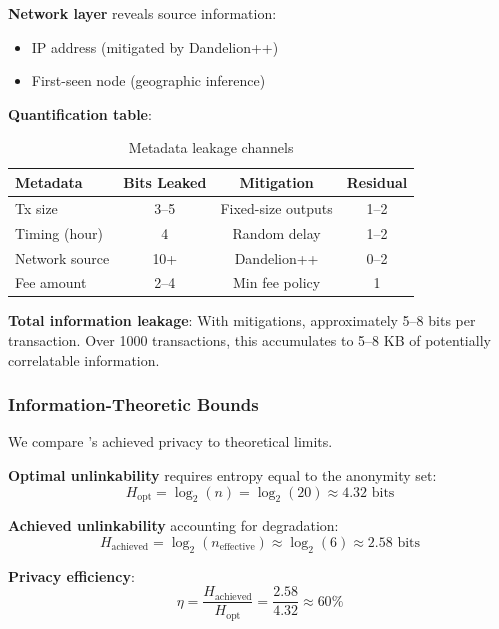 \textbf{Network layer} reveals source information:
\begin{itemize}
  \item IP address (mitigated by Dandelion++)
  \item First-seen node (geographic inference)
\end{itemize}

\textbf{Quantification table}:

\begin{table}[h]
\centering
\caption{Metadata leakage channels}
\label{tab:metadata-leak}
\begin{tabular}{@{}lccc@{}}
\toprule
\textbf{Metadata} & \textbf{Bits Leaked} & \textbf{Mitigation} & \textbf{Residual} \\
\midrule
Tx size & 3--5 & Fixed-size outputs & 1--2 \\
Timing (hour) & 4 & Random delay & 1--2 \\
Network source & 10+ & Dandelion++ & 0--2 \\
Fee amount & 2--4 & Min fee policy & 1 \\
\bottomrule
\end{tabular}
\end{table}

\textbf{Total information leakage}: With mitigations, approximately 5--8 bits
per transaction. Over 1000 transactions, this accumulates to 5--8 KB of
potentially correlatable information.

\subsubsection{Information-Theoretic Bounds}

We compare \Botho's achieved privacy to theoretical limits.

\textbf{Optimal unlinkability} requires entropy equal to the anonymity set:
\begin{equation}
H_{\text{opt}} = \log_2(n) = \log_2(20) \approx 4.32 \text{ bits}
\end{equation}

\textbf{Achieved unlinkability} accounting for degradation:
\begin{equation}
H_{\text{achieved}} = \log_2(n_{\text{effective}}) \approx \log_2(6) \approx 2.58 \text{ bits}
\end{equation}

\textbf{Privacy efficiency}:
\begin{equation}
\eta = \frac{H_{\text{achieved}}}{H_{\text{opt}}} = \frac{2.58}{4.32} \approx 60\%
\end{equation}

